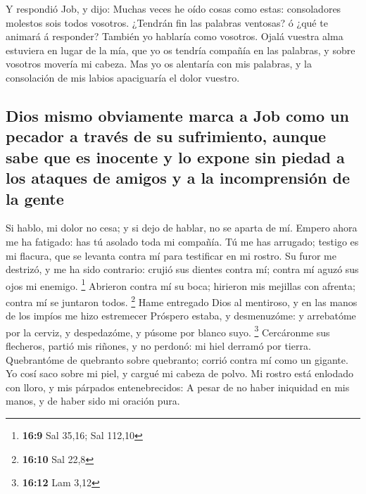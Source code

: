  Y respondió Job, y dijo:  Muchas veces he
oído cosas como estas: consoladores molestos sois todos vosotros.
 ¿Tendrán fin las palabras ventosas? ó ¿qué te animará á
responder?  También yo hablaría como vosotros. Ojalá
vuestra alma estuviera en lugar de la mía, que yo os tendría compañía en
las palabras, y sobre vosotros movería mi cabeza.  Mas yo
os alentaría con mis palabras, y la consolación de mis labios
apaciguaría el dolor vuestro.

\hypertarget{dios-mismo-obviamente-marca-a-job-como-un-pecador-a-travuxe9s-de-su-sufrimiento-aunque-sabe-que-es-inocente-y-lo-expone-sin-piedad-a-los-ataques-de-amigos-y-a-la-incomprensiuxf3n-de-la-gente}{%
\subsection{Dios mismo obviamente marca a Job como un pecador a través
de su sufrimiento, aunque sabe que es inocente y lo expone sin piedad a
los ataques de amigos y a la incomprensión de la
gente}\label{dios-mismo-obviamente-marca-a-job-como-un-pecador-a-travuxe9s-de-su-sufrimiento-aunque-sabe-que-es-inocente-y-lo-expone-sin-piedad-a-los-ataques-de-amigos-y-a-la-incomprensiuxf3n-de-la-gente}}

 Si hablo, mi dolor no cesa; y si dejo de hablar, no se
aparta de mí.  Empero ahora me ha fatigado: has tú asolado
toda mi compañía.  Tú me has arrugado; testigo es mi
flacura, que se levanta contra mí para testificar en mi rostro.
 Su furor me destrizó, y me ha sido contrario: crujió sus
dientes contra mí; contra mí aguzó sus ojos mi enemigo. \footnote{\textbf{16:9}
  Sal 35,16; Sal 112,10}  Abrieron contra mí su boca;
hirieron mis mejillas con afrenta; contra mí se juntaron todos.
\footnote{\textbf{16:10} Sal 22,8}  Hame entregado Dios
al mentiroso, y en las manos de los impíos me hizo estremecer
 Próspero estaba, y desmenuzóme: y arrebatóme por la
cerviz, y despedazóme, y púsome por blanco suyo. \footnote{\textbf{16:12}
  Lam 3,12}  Cercáronme sus flecheros, partió mis
riñones, y no perdonó: mi hiel derramó por tierra. 
Quebrantóme de quebranto sobre quebranto; corrió contra mí como un
gigante.  Yo cosí saco sobre mi piel, y cargué mi cabeza
de polvo.  Mi rostro está enlodado con lloro, y mis
párpados entenebrecidos:  A pesar de no haber iniquidad
en mis manos, y de haber sido mi oración pura.

